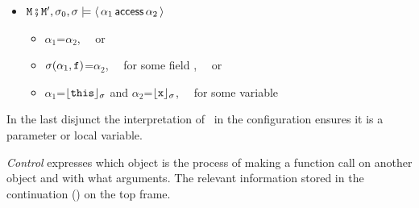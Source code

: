 \begin{definition}[%
Permission]  \label{def:valid:assertion:access}
\begin{itemize}
\item
${\mbox{\tt{\ensuremath{{\mbox{\tt{M}}}}}}}\fatsemi {\mbox{\tt{\ensuremath{{\mbox{\tt{M}}}}}}}', \sigma_0 , \sigma \models  \langle\, \alpha_1\, \mathsf{access}\, \alpha_2\, \rangle$  \IFF  
\begin{itemize}
\item
$\alpha_1$=$\alpha_{2}$, \ \ or
\item
$\sigma(\alpha_1,{\mbox{\tt{f}}}) $=${\alpha_2}$, \  \ for some field ,  \ \ or
\item
${\alpha_1}$=${\lfloor{ {{\mbox{\tt{this}}}}}\rfloor_{\sigma}}$ and
  ${\alpha_2}$=${\lfloor{ {{\mbox{\tt{x}}}}}\rfloor_{\sigma}}$, \ \ for some variable \x
\end{itemize}
\end{itemize}
\end{definition}



\noindent 
In the last disjunct the interpretation of \x\ in the configuration ensures it is a parameter or local variable.

\vspace{.2cm} \noindent
\textit{Control} expresses which object is the process of making a function call on another object and
with what arguments. The relevant information
 stored in the continuation () on the top frame.

